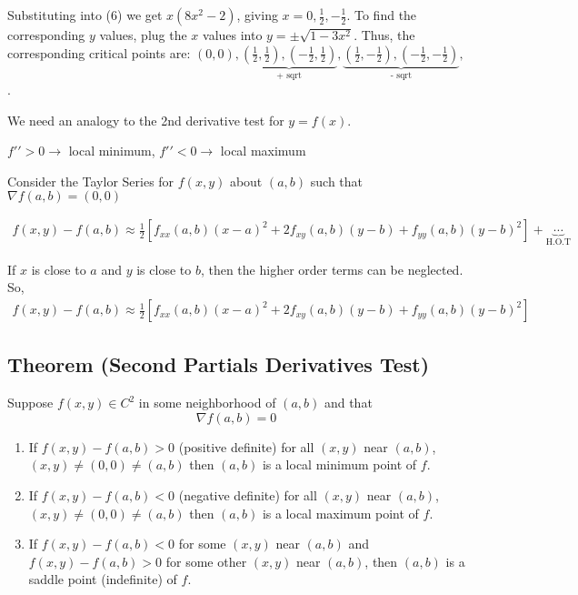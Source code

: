 Substituting into (6) we get $ x(8x^2-2) $, giving 
$ x=0,\frac{1}{2},-\frac{1}{2} $. To find the corresponding $ y $ values,
plug the $ x $ values into $ y=\pm \sqrt{1-3x^2} $. Thus, the corresponding
critical points are: 
$ (0,0),
\underbrace{(\frac{1}{2},\frac{1}{2}),(-\frac{1}{2},\frac{1}{2})}_
{\text{+ sqrt}},
\underbrace{(\frac{1}{2},-\frac{1}{2}),(-\frac{1}{2},-\frac{1}{2})}_
{\text{- sqrt}},$. 

We need an analogy to the 2nd derivative test for $ y=f(x) $.

$ f\prime\prime>0 \rightarrow$ local minimum, 
$ f\prime\prime<0 \rightarrow$ local maximum

Consider the Taylor Series for $ f(x,y) $ about $ (a,b) $ such that 
$ \nabla f(a,b)=(0,0) $

\begin{align} 
    f(x,y)-f(a,b)\approx
    \frac{1}{2} \left[f_{xx}(a,b)(x-a)^2+2f_{xy}(a,b)(y-b)+f_{yy}(a,b)(y-b)^2\right]+
    \underbrace{\cdots}_{\text{H.O.T}}
\end{align}

If $ x $ is close to $ a $ and $ y $ is close to $ b $, then the
higher order terms can be neglected. So,
\begin{align}
    f(x,y)-f(a,b)\approx 
\frac{1}{2} \left[f_{xx}(a,b)(x-a)^2+2f_{xy}(a,b)(y-b)+f_{yy}(a,b)(y-b)^2\right]
\end{align}

\begin{thmbox}
    \subsection{Theorem (Second Partials Derivatives Test)}
    Suppose $ f(x,y)\in C^2 $ in some neighborhood of $ (a,b) $ 
    and that
    \[ \nabla f(a,b)=0 \]

    \begin{enumerate}[(1)]
        \item If $ f(x,y)-f(a,b)>0 $ (positive definite) for all 
        $ (x,y) $ near $ (a,b) $, $ (x,y)\neq(0,0)\neq(a,b) $ 
        then $ (a,b) $ is a local minimum point of $ f $.
        \item If $ f(x,y)-f(a,b)<0 $ (negative definite) for all 
        $ (x,y) $ near $ (a,b) $, $ (x,y)\neq(0,0)\neq(a,b) $ 
        then $ (a,b) $ is a local maximum point of $ f $.
        \item If  $ f(x,y)-f(a,b)< 0 $ for some $ (x,y) $ near $ (a,b) $ and
        $ f(x,y)-f(a,b)> 0 $ for some other $ (x,y) $ near $ (a,b) $, then
        $ (a,b) $ is a saddle point (indefinite) of $ f $.
    \end{enumerate}
\end{thmbox}